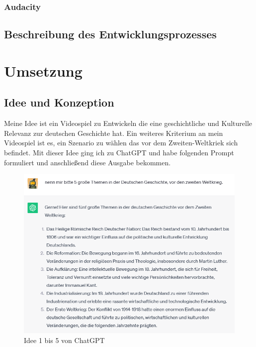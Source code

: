 \documentclass[12pt,a4paper,bibliography=totocnumbered,listof=totocnumbered]{scrartcl}
\begin{document}
\subsubsection{Audacity}

\subsection{Beschreibung des Entwicklungsprozesses}


\section{Umsetzung}
\subsection {Idee und Konzeption}
Meine Idee ist ein Videospiel zu Entwickeln die eine geschichtliche und Kulturelle Relevanz zur deutschen Geschichte hat. Ein weiteres Kriterium an mein Videospiel ist es, ein Szenario zu wählen das vor dem Zweiten-Weltkriek sich befindet.
Mit dieser Idee ging ich zu ChatGPT und habe folgenden Prompt formuliert und anschließend diese Ausgabe bekommen.
\\
\begin{figure}[h]
	\centering
	\includegraphics[scale=0.7]{BilderFuerBA/ChatGPT5Themen1.png}
	\caption{Idee  1 bis 5 von ChatGPT}
	\label{fig:Ersten-Fünf-Idenn}
\end{figure}
\\
\end{document}
